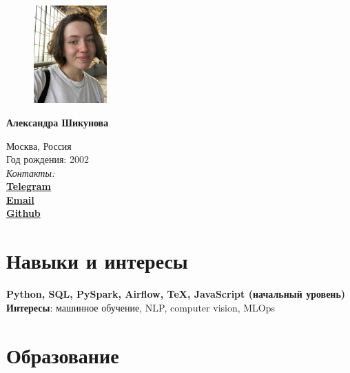 \documentclass[11pt]{article} %
\begin{document}

\begin{figure} %
    \centering
    \includegraphics[width=0.25\textwidth]{photo}
\end{figure}
{\LARGE\bfseries Александра Шикунова} %
\bigskip\bigskip\medskip %

Москва, Россия\\
Год рождения: 2002\\

\textit{Контакты:}\\
\textbf{\href{https://t.me/thnlgrlivrlvdwsbrnwthrssnhrys}{Telegram}}\\
\textbf{\href{mailto:notalexandrashikunova@gmail.com}{Email}}\\
\textbf{\href{https://github.com/poisongrapevine}{Github}}
\medskip %


\section*{Навыки и интересы}

\textbf{Python, SQL, PySpark, Airflow, TeX, JavaScript (начальный уровень)}\\
\textbf{Интересы}: машинное обучение, NLP, computer vision, MLOps


\section*{Образование}
\end{document}
